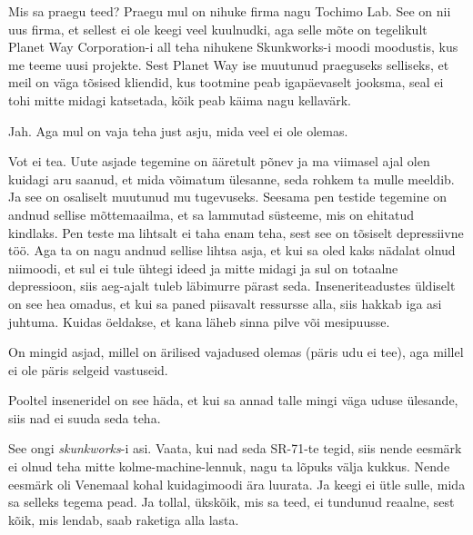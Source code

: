 
Mis sa praegu teed? Praegu mul on nihuke firma nagu Tochimo Lab. See on nii uus firma, et sellest ei ole keegi veel kuulnudki, aga selle mõte on tegelikult Planet Way Corporation-i all teha nihukene Skunkworks-i moodi moodustis, kus me teeme uusi projekte. Sest Planet Way ise muutunud praeguseks selliseks, et meil on väga tõsised kliendid, kus tootmine peab igapäevaselt jooksma, seal ei tohi mitte midagi katsetada,  kõik peab  käima nagu kellavärk. 


Jah. Aga mul on vaja teha just asju, mida veel ei ole olemas. 


Vot ei tea. Uute asjade tegemine on ääretult põnev ja ma  viimasel ajal olen kuidagi  aru saanud, et mida võimatum ülesanne, seda rohkem ta mulle meeldib. Ja see on osaliselt muutunud mu tugevuseks. Seesama pen testide tegemine on andnud sellise mõttemaailma, et sa lammutad süsteeme, mis on ehitatud kindlaks. Pen teste  ma lihtsalt ei taha enam teha, sest see on tõsiselt depressiivne töö. Aga ta on nagu andnud sellise lihtsa asja, et kui sa oled kaks nädalat olnud niimoodi, et sul ei tule ühtegi ideed ja mitte midagi ja sul on totaalne depressioon, siis aeg-ajalt tuleb läbimurre pärast seda. Inseneriteadustes üldiselt on see hea omadus, et kui sa paned piisavalt ressursse alla, siis hakkab iga asi juhtuma. Kuidas öeldakse, et kana läheb sinna pilve või mesipuusse.


On mingid asjad, millel on ärilised vajadused olemas (päris udu ei tee),  aga millel ei ole päris selgeid vastuseid. 

Pooltel inseneridel on see häda, et kui sa annad talle mingi väga uduse ülesande, siis nad ei suuda seda teha.


See ongi \emph{skunkworks}-i asi. Vaata, kui nad seda SR-71-te tegid, siis nende eesmärk ei olnud teha mitte kolme-machine-lennuk, nagu ta lõpuks välja kukkus. Nende eesmärk oli Venemaal kohal kuidagimoodi ära luurata. Ja keegi ei ütle sulle, mida sa selleks tegema pead. Ja tollal, ükskõik, mis sa teed, ei tundunud reaalne, sest  kõik, mis lendab, saab raketiga alla lasta. 

